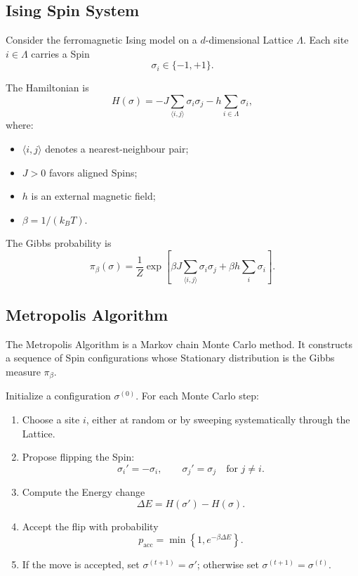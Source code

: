 \documentclass[a4paper, 10pt, onepage]{elegantbook}
\begin{document}
{\subsection{Ising Spin System}

Consider the ferromagnetic Ising model on a \(d\)-dimensional Lattice
\(\Lambda\). Each site \(i\in\Lambda\) carries a Spin
\[
\sigma_i\in\{-1,+1\}.
\]

The Hamiltonian is
\[
H(\sigma)
=
-J\sum_{\langle i,j\rangle}\sigma_i\sigma_j
-h\sum_{i\in\Lambda}\sigma_i,
\]
where:

\begin{itemize}
\item \(\langle i,j\rangle\) denotes a nearest-neighbour pair;
\item \(J>0\) favors aligned Spins;
\item \(h\) is an external magnetic field;
\item \(\beta=1/(k_BT)\).
\end{itemize}

The Gibbs probability is
\[
\pi_\beta(\sigma)
=
\frac{1}{Z}
\exp\left[
\beta J\sum_{\langle i,j\rangle}\sigma_i\sigma_j
+
\beta h\sum_i\sigma_i
\right].
\]

\subsection{Metropolis Algorithm}

The Metropolis Algorithm is a Markov chain Monte Carlo method. It constructs a
sequence of Spin configurations whose Stationary distribution is the Gibbs
measure \(\pi_\beta\).

Initialize a configuration \(\sigma^{(0)}\). For each Monte Carlo step:

\begin{enumerate}
\item Choose a site \(i\), either at random or by sweeping systematically
through the Lattice.

\item Propose flipping the Spin:
\[
\sigma_i'=-\sigma_i,
\qquad
\sigma_j'=\sigma_j
\quad\text{for }j\ne i.
\]

\item Compute the Energy change
\[
\Delta E
=
H(\sigma')-H(\sigma).
\]

\item Accept the flip with probability
\[
p_{\mathrm{acc}}
=
\min\left\{1,e^{-\beta\Delta E}\right\}.
\]

\item If the move is accepted, set \(\sigma^{(t+1)}=\sigma'\); otherwise set
\(\sigma^{(t+1)}=\sigma^{(t)}\).
\end{enumerate}

}
\end{document}
